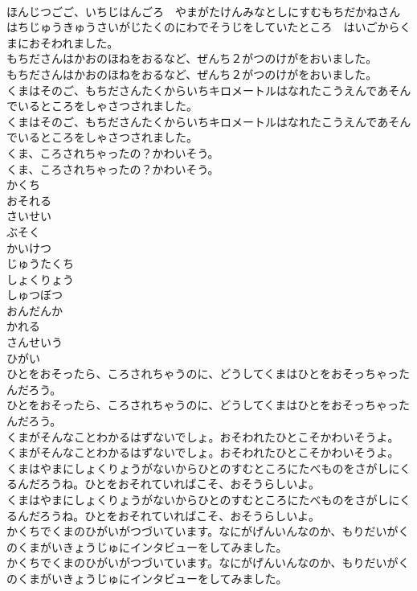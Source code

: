 \documentclass[8pt]{extreport}
\begin{document}
\begin{CJK}{UTF8}{min}
\\	ほんじつごご、いちじはんごろ　やまがたけんみなとしにすむもちだかねさんはちじゅうきゅうさいがじたくのにわでそうじをしていたところ　はいごからくまにおそわれました。
\\	もちださんはかおのほねをおるなど、ぜんち２がつのけがをおいました。
\\	もちださんはかおのほねをおるなど、ぜんち２がつのけがをおいました。
\\	くまはそのご、もちださんたくからいちキロメートルはなれたこうえんであそんでいるところをしゃさつされました。
\\	くまはそのご、もちださんたくからいちキロメートルはなれたこうえんであそんでいるところをしゃさつされました。
\\	くま、ころされちゃったの？かわいそう。
\\	くま、ころされちゃったの？かわいそう。
\\	かくち
\\	おそれる
\\	さいせい
\\	ぶそく
\\	かいけつ
\\	じゅうたくち
\\	しょくりょう
\\	しゅつぼつ
\\	おんだんか
\\	かれる
\\	さんせいう
\\	ひがい
\\	ひとをおそったら、ころされちゃうのに、どうしてくまはひとをおそっちゃったんだろう。
\\	ひとをおそったら、ころされちゃうのに、どうしてくまはひとをおそっちゃったんだろう。
\\	くまがそんなことわかるはずないでしょ。おそわれたひとこそかわいそうよ。
\\	くまがそんなことわかるはずないでしょ。おそわれたひとこそかわいそうよ。
\\	くまはやまにしょくりょうがないからひとのすむところにたべものをさがしにくるんだろうね。ひとをおそれていればこそ、おそうらしいよ。
\\	くまはやまにしょくりょうがないからひとのすむところにたべものをさがしにくるんだろうね。ひとをおそれていればこそ、おそうらしいよ。
\\	かくちでくまのひがいがつづいています。なにがげんいんなのか、もりだいがくのくまがいきょうじゅにインタビューをしてみました。
\\	かくちでくまのひがいがつづいています。なにがげんいんなのか、もりだいがくのくまがいきょうじゅにインタビューをしてみました。

\end{CJK}
\end{document}
